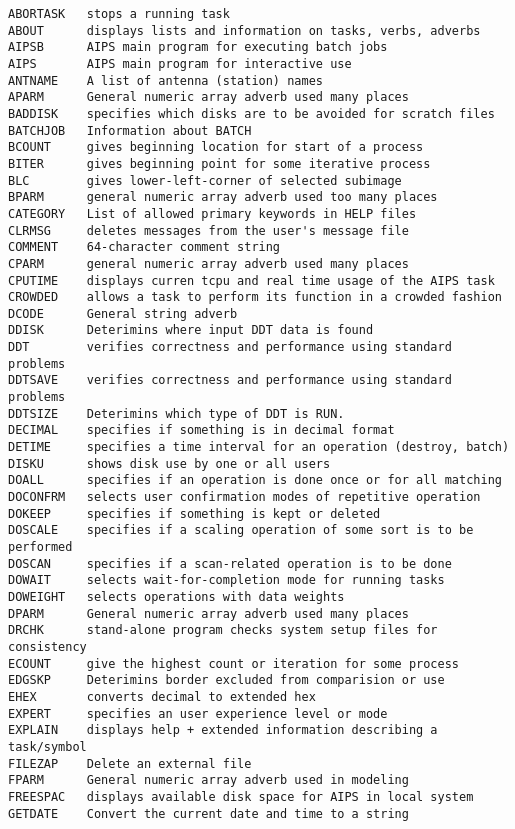 \vskip 0.5pt
\bbve\begin{verbatim}
ABORTASK   stops a running task
ABOUT      displays lists and information on tasks, verbs, adverbs
AIPSB      AIPS main program for executing batch jobs
AIPS       AIPS main program for interactive use
ANTNAME    A list of antenna (station) names
APARM      General numeric array adverb used many places
BADDISK    specifies which disks are to be avoided for scratch files
BATCHJOB   Information about BATCH
BCOUNT     gives beginning location for start of a process
BITER      gives beginning point for some iterative process
BLC        gives lower-left-corner of selected subimage
BPARM      general numeric array adverb used too many places
CATEGORY   List of allowed primary keywords in HELP files
CLRMSG     deletes messages from the user's message file
COMMENT    64-character comment string
CPARM      general numeric array adverb used many places
CPUTIME    displays curren tcpu and real time usage of the AIPS task
CROWDED    allows a task to perform its function in a crowded fashion
DCODE      General string adverb
DDISK      Deterimins where input DDT data is found
DDT        verifies correctness and performance using standard problems
DDTSAVE    verifies correctness and performance using standard problems
DDTSIZE    Deterimins which type of DDT is RUN.
DECIMAL    specifies if something is in decimal format
DETIME     specifies a time interval for an operation (destroy, batch)
DISKU      shows disk use by one or all users
DOALL      specifies if an operation is done once or for all matching
DOCONFRM   selects user confirmation modes of repetitive operation
DOKEEP     specifies if something is kept or deleted
DOSCALE    specifies if a scaling operation of some sort is to be performed
DOSCAN     specifies if a scan-related operation is to be done
DOWAIT     selects wait-for-completion mode for running tasks
DOWEIGHT   selects operations with data weights
DPARM      General numeric array adverb used many places
DRCHK      stand-alone program checks system setup files for consistency
ECOUNT     give the highest count or iteration for some process
EDGSKP     Deterimins border excluded from comparision or use
EHEX       converts decimal to extended hex
EXPERT     specifies an user experience level or mode
EXPLAIN    displays help + extended information describing a task/symbol
FILEZAP    Delete an external file
FPARM      General numeric array adverb used in modeling
FREESPAC   displays available disk space for AIPS in local system
GETDATE    Convert the current date and time to a string

\end{verbatim}
